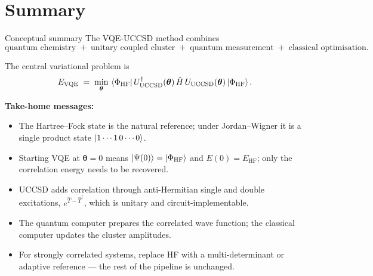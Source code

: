 \documentclass[10pt,aspectratio=169]{beamer}
\begin{document}
\section{Summary}

\begin{frame}{Conceptual summary}
The VQE-UCCSD method combines
\[
\text{quantum chemistry}\;+\;\text{unitary coupled cluster}\;+\;\text{quantum measurement}\;+\;\text{classical optimisation}.
\]

The central variational problem is
\[
E_{\mathrm{VQE}}
\;=\;
\min_{\bm\theta}\,
\bra{\Phi_{\mathrm{HF}}}
U^\dagger_{\mathrm{UCCSD}}(\bm\theta)\,
\hat H\,
U_{\mathrm{UCCSD}}(\bm\theta)
\ket{\Phi_{\mathrm{HF}}}.
\]

\medskip
\textbf{Take-home messages:}
\begin{itemize}
  \item The Hartree--Fock state is the natural reference; under Jordan--Wigner it is a single product state $\ket{1\cdots1\,0\cdots0}$.
  \item Starting VQE at $\bm\theta=0$ means $\ket{\Psi(0)} = \ket{\Phi_{\mathrm{HF}}}$ and $E(0) = E_{\mathrm{HF}}$; only the correlation energy needs to be recovered.
  \item UCCSD adds correlation through anti-Hermitian single and double excitations, $e^{\hat T - \hat T^\dagger}$, which is unitary and circuit-implementable.
  \item The quantum computer prepares the correlated wave function; the classical computer updates the cluster amplitudes.
  \item For strongly correlated systems, replace HF with a multi-determinant or adaptive reference --- the rest of the pipeline is unchanged.
\end{itemize}
\end{frame}
\end{document}
